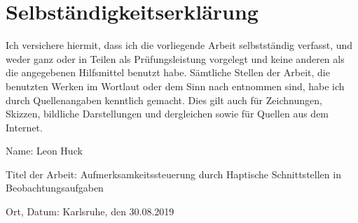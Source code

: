 \documentclass{llncs}					%
\begin{document}






\section{Selbständigkeitserklärung}

Ich versichere hiermit, dass ich die vorliegende Arbeit selbstständig verfasst, und weder ganz oder in Teilen als Prüfungsleistung vorgelegt und keine anderen als die angegebenen Hilfsmittel benutzt habe. Sämtliche Stellen der Arbeit, die benutzten Werken im Wortlaut oder dem Sinn nach entnommen sind, habe ich durch Quellenangaben kenntlich gemacht. Dies gilt auch für Zeichnungen, Skizzen, bildliche Darstellungen und dergleichen sowie für Quellen aus dem Internet.

Name: Leon Huck

Titel der Arbeit: Aufmerksamkeitssteuerung durch Haptische Schnittstellen in Beobachtungsaufgaben

Ort, Datum: Karlsruhe, den 30.08.2019

\clearpage

\end{document}
